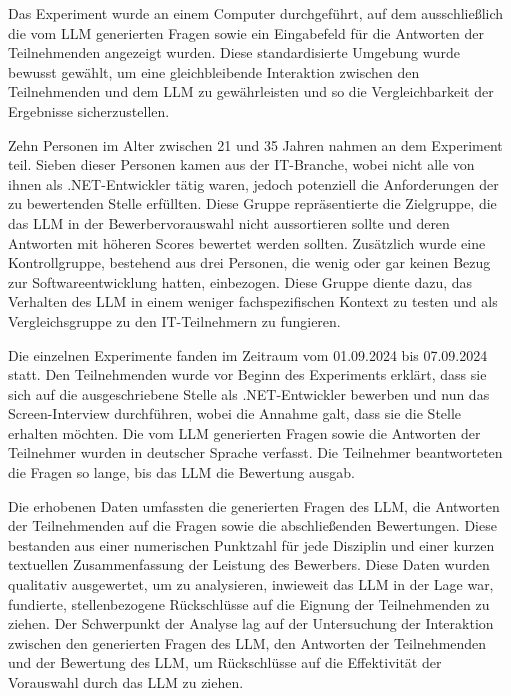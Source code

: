 Das Experiment wurde an einem Computer durchgeführt, auf dem ausschließlich die vom \acs{LLM} 
generierten Fragen sowie ein Eingabefeld für die Antworten der Teilnehmenden angezeigt wurden. 
Diese standardisierte Umgebung wurde bewusst gewählt, um eine gleichbleibende Interaktion zwischen 
den Teilnehmenden und dem \acs{LLM} zu gewährleisten und so die Vergleichbarkeit der Ergebnisse 
sicherzustellen. 


Zehn Personen im Alter zwischen 21 und 35 Jahren nahmen an dem Experiment teil. 
Sieben dieser Personen kamen aus der IT-Branche, wobei nicht alle von ihnen als .NET-Entwickler tätig waren, 
jedoch potenziell die Anforderungen der zu bewertenden Stelle erfüllten. Diese Gruppe 
repräsentierte die Zielgruppe, die das \acs{LLM} in der Bewerbervorauswahl nicht aussortieren sollte und 
deren Antworten mit höheren Scores bewertet werden sollten. Zusätzlich wurde eine Kontrollgruppe, 
bestehend aus drei Personen, die wenig oder gar keinen Bezug zur Softwareentwicklung hatten, einbezogen. 
Diese Gruppe diente dazu, das Verhalten des \acs{LLM} in einem weniger fachspezifischen Kontext zu 
testen und als Vergleichsgruppe zu den IT-Teilnehmern zu fungieren. 


Die einzelnen Experimente fanden im Zeitraum vom 01.09.2024 bis 07.09.2024 statt. Den 
Teilnehmenden wurde vor Beginn des Experiments erklärt, dass sie sich auf die ausgeschriebene 
Stelle als .NET-Entwickler bewerben und nun das Screen-Interview durchführen, wobei die Annahme 
galt, dass sie die Stelle erhalten möchten. Die vom \acs{LLM} generierten Fragen sowie die Antworten der 
Teilnehmer wurden in deutscher Sprache verfasst. Die Teilnehmer beantworteten die Fragen so lange, 
bis das \acs{LLM} die Bewertung ausgab. 


Die erhobenen Daten umfassten die generierten Fragen des \acs{LLM}, die Antworten der Teilnehmenden auf 
die Fragen sowie die abschließenden Bewertungen. Diese bestanden aus einer numerischen Punktzahl 
für jede Disziplin und einer kurzen textuellen Zusammenfassung der Leistung des Bewerbers. 
Diese Daten wurden qualitativ ausgewertet, um zu analysieren, inwieweit das \acs{LLM} in der Lage war, 
fundierte, stellenbezogene Rückschlüsse auf die Eignung der Teilnehmenden zu ziehen. Der 
Schwerpunkt der Analyse lag auf der Untersuchung der Interaktion zwischen den generierten Fragen 
des \acs{LLM}, den Antworten der Teilnehmenden und der Bewertung des \acs{LLM}, um Rückschlüsse auf die 
Effektivität der Vorauswahl durch das \acs{LLM} zu ziehen. 






